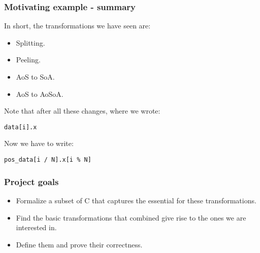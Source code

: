 \begin{frame}[fragile]
\frametitle{Motivating example - summary}

In short, the transformations we have seen are:
\begin{itemize}
	\item Splitting.
	\item Peeling.
	\item AoS to SoA.
	\item AoS to AoSoA.
\end{itemize}

\bigskip

Note that after all these changes, where we wrote:

\begin{lstlisting}[style=Cstyle]
  data[i].x 
\end{lstlisting}

Now we have to write:

\begin{lstlisting}[style=Cstyle]
  pos_data[i / N].x[i % N]
\end{lstlisting}

\end{frame}


\begin{frame}[fragile]
\frametitle{Project goals}

\begin{itemize}
	\setlength\itemsep{1.5em}
	\item Formalize a subset of C that captures the essential for these transformations.\\
	\item Find the basic transformations that combined give rise to the ones we are interested in.\\
	\item Define them and prove their correctness.
\end{itemize}

\end{frame}


